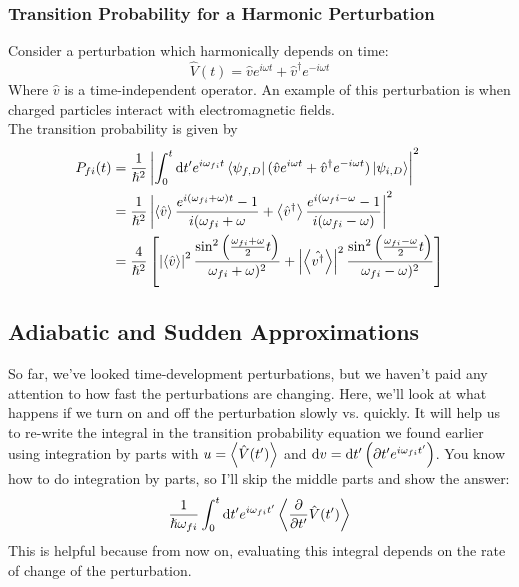 \documentclass[a4paper]{article}
\begin{document}
\subsubsection{Transition Probability for a Harmonic Perturbation}
\label{hw2:e}
Consider a perturbation which harmonically depends on time:
\[ \hat{V}(t) = \hat{v} e^{i\omega t}+\hat{v}^\dagger e^{-i\omega t} \]
Where $\hat{v}$ is a time-independent operator. An example of this
perturbation is when charged particles interact with electromagnetic fields.\\
The transition probability is given by
\begin{align*}
	P_{fi}(t) &= \frac{1}{\hslash^2}\left\lvert \int_0^t\mathrm{d} t'e^{i\omega_{fi}t}
		\left\langle \psi_{f,D} \right\rvert(\hat{v} e^{i\omega t}+
		\hat{v}^\dagger e^{-i\omega t})\left\lvert \psi_{i,D}\right\rangle\right\rvert^2\\
		&= \frac{1}{\hslash^2}\left\lvert \left\langle \hat{v}\right\rangle\frac{
			e^{i(\omega_{fi}+\omega)t}-1}{i(\omega_{fi}+\omega}
			+ \left\langle \hat{v}^\dagger\right\rangle\frac{e^{i(\omega_fi-
			\omega}-1}{i(\omega_{fi}-\omega)}\right\rvert^2\\
		&= \frac{4}{\hslash^2}\left[
			\left\lvert \left\langle \hat{v}\right\rangle\right\rvert^2\frac{\sin^2\left(
			\frac{\omega_{fi}+\omega}{2}t\right)}{\omega_{fi}
			+\omega)^2}+
			\left\lvert \left\langle \hat{v^\dagger}\right\rangle\right\rvert^2\frac{\sin^2\left(
			\frac{\omega_{fi}-\omega}{2}t\right)}{\omega_{fi}
			-\omega)^2}
		\right]
\end{align*}

\subsection{Adiabatic and Sudden Approximations}
\label{hw3:b}
So far, we've looked time-development perturbations, but we haven't paid
any attention to how fast the perturbations are changing. Here, we'll look at
what happens if we turn on and off the perturbation slowly vs. quickly. It will
help us to re-write the integral in the transition probability equation we
found earlier using integration by parts with $u=\left\langle \hat{V}(t')\right\rangle$ and
$\mathrm{d} v = \mathrm{d} t'\left(\partial{t'}e^{i\omega_{fi}t'}\right)$. You know how
to do integration by parts, so I'll skip the middle parts and show the answer:
\[ \frac{1}{\hslash\omega_{fi}}\int_0^t\d t' e^{i\omega_{fi}t'}\exval{\pd{t'}
\hat{V}(t')} \]
This is helpful because from now on, evaluating this integral depends on
the rate of change of the perturbation.
\end{document}
